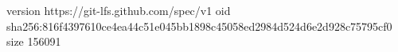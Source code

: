 version https://git-lfs.github.com/spec/v1
oid sha256:816f4397610ce4ea44c51e045bb1898c45058ed2984d524d6e2d928c75795cf0
size 156091
